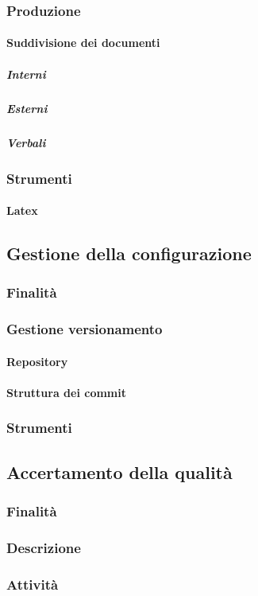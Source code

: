 \documentclass[../norme-di-progetto.tex]{subfiles}
\begin{document}
\subsubsection{Produzione}
\paragraph{Suddivisione dei documenti}
\subparagraph{Interni}
\subparagraph{Esterni}
\subparagraph{Verbali}
\subsubsection{Strumenti}
\paragraph {Latex}
\subsection{Gestione della configurazione}
\subsubsection{Finalità}
\subsubsection{Gestione versionamento}
\paragraph{Repository}
\paragraph{Struttura dei commit}
\subsubsection{Strumenti}
\subsection{Accertamento della qualità}
\subsubsection{Finalità}
\subsubsection{Descrizione}
\subsubsection{Attività}
\end{document}
